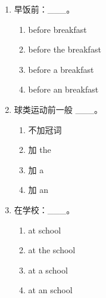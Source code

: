 \documentclass[11pt,a4paper]{ctexart}
\begin{document}
\begin{enumerate}[leftmargin=*,itemsep=4pt]
\begin{enumerate}[label=\Alph*.,leftmargin=2em,itemsep=1pt,topsep=2pt]
\end{enumerate}
\item 早饭前：\_\_\_。
\begin{enumerate}[label=\Alph*.,leftmargin=2em,itemsep=1pt,topsep=2pt]
\item before breakfast
\item before the breakfast
\item before a breakfast
\item before an breakfast
\end{enumerate}
\item 球类运动前一般 \_\_\_。
\begin{enumerate}[label=\Alph*.,leftmargin=2em,itemsep=1pt,topsep=2pt]
\item 不加冠词
\item 加 the
\item 加 a
\item 加 an
\end{enumerate}
\item 在学校：\_\_\_。
\begin{enumerate}[label=\Alph*.,leftmargin=2em,itemsep=1pt,topsep=2pt]
\item at school
\item at the school
\item at a school
\item at an school
\end{enumerate}
\end{enumerate}
\end{document}
